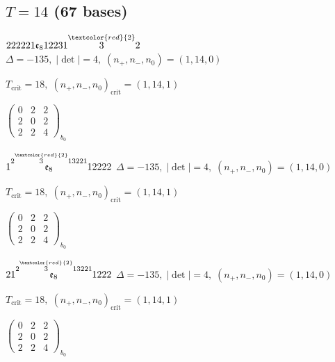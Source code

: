 \documentclass[10pt]{article}
\begin{document}
\subsection*{$T = 14$ \quad (67 bases)}
\smallskip

$222221\mathfrak{e}_812231\overset{\textcolor{red}{2}}{3}2$ \quad $\Delta=-135,\; |\det|=4,\; (n_+,n_-,n_0)=(1,14,0)$

\hspace{1em}$T_{\text{crit}}=18,\; (n_+,n_-,n_0)_{\text{crit}}=(1,14,1)$

\hspace{2em}$\left(\begin{smallmatrix}0 & 2 & 2 \\ 2 & 0 & 2 \\ 2 & 2 & 4\end{smallmatrix}\right)_{\!b_0}$

\smallskip

$1\overset{2\overset{\textcolor{red}{2}}{3}13221}{\mathfrak{e}_8}12222$ \quad $\Delta=-135,\; |\det|=4,\; (n_+,n_-,n_0)=(1,14,0)$

\hspace{1em}$T_{\text{crit}}=18,\; (n_+,n_-,n_0)_{\text{crit}}=(1,14,1)$

\hspace{2em}$\left(\begin{smallmatrix}0 & 2 & 2 \\ 2 & 0 & 2 \\ 2 & 2 & 4\end{smallmatrix}\right)_{\!b_0}$

\smallskip

$21\overset{2\overset{\textcolor{red}{2}}{3}13221}{\mathfrak{e}_8}1222$ \quad $\Delta=-135,\; |\det|=4,\; (n_+,n_-,n_0)=(1,14,0)$

\hspace{1em}$T_{\text{crit}}=18,\; (n_+,n_-,n_0)_{\text{crit}}=(1,14,1)$

\hspace{2em}$\left(\begin{smallmatrix}0 & 2 & 2 \\ 2 & 0 & 2 \\ 2 & 2 & 4\end{smallmatrix}\right)_{\!b_0}$

\smallskip
\end{document}
